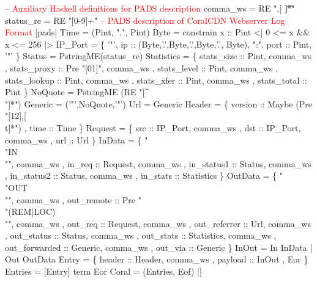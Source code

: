 
\begin{code}
\textcolor{red}{-- Auxiliary Haskell definitions for PADS description}
comma\_ws = RE ",[ \t]*"
status\_re = RE "[0-9]+"
\mbox{}
\textcolor{red}{-- PADS description of CoralCDN Webserver Log Format}
[pads|
   Time = (Pint, ".", Pint)
\mbox{}
   Byte = constrain x :: Pint  <| 0 <= x && x <= 256 |>
\mbox{}
   IP\_Port = 
    \{ '"', 
      ip :: (Byte,'.',Byte,'.',Byte,'.', Byte), ":",
      port :: Pint, '"' \}
\mbox{}
   Status = PstringME(status\_re)
\mbox{}
   Statistics = 
    \{ stats\_size       :: Pint,      comma\_ws
    , stats\_proxy      :: Pre "[01]",  comma\_ws
    , stats\_level      :: Pint,      comma\_ws
    , stats\_lookup     :: Pint,      comma\_ws
    , stats\_xfer       :: Pint,      comma\_ws
    , stats\_total      :: Pint \}
\mbox{}
   NoQuote = PstringME (RE "[^\\"]*")
\mbox{}
   Generic = ('"',NoQuote,'"')
\mbox{}
   Url = Generic
\mbox{}
   Header = 
    \{ version       :: Maybe (Pre "[12],[ \\t]*")
    , time          :: Time     \}
\mbox{}
   Request = 
   \{ src       :: IP\_Port, comma\_ws
   , dst       :: IP\_Port, comma\_ws
   , url       :: Url \} 
\mbox{}
   InData =
    \{ "\\"IN\\"",               comma\_ws
    , in\_req     :: Request,  comma\_ws
    , in\_status1 :: Status,   comma\_ws
    , in\_status2 :: Status,   comma\_ws
    , in\_stats   :: Statistics \}
\mbox{}
   OutData = 
    \{ "\\"OUT\\"",                            comma\_ws 
    , out\_remote    :: Pre "\\"(REM|LOC)\\"", comma\_ws
    , out\_req       :: Request,             comma\_ws
    , out\_referrer  :: Url,                 comma\_ws
    , out\_status    :: Status,              comma\_ws
    , out\_stats     :: Statistics,          comma\_ws
    , out\_forwarded :: Generic,             comma\_ws
    , out\_via       :: Generic  \}
\mbox{}
   InOut = In InData | Out OutData
\mbox{}
   Entry = 
    \{ header  :: Header,   comma\_ws
    , payload :: InOut
    , Eor \}
\mbox{}
   Entries = [Entry]  term Eor
\mbox{}  
   Coral = (Entries, Eof)
|]
\end{code}

